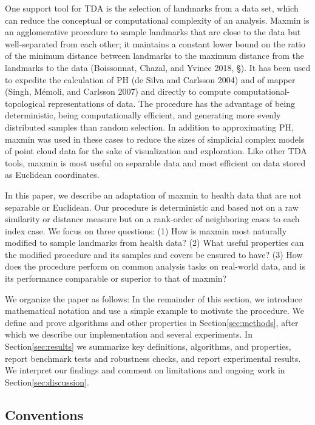 \documentclass{article}
\begin{document}
One support tool for TDA is the selection of landmarks from a data set,
which can reduce the conceptual or computational complexity of an
analysis. Maxmin is an agglomerative procedure to sample landmarks that
are close to the data but well-separated from each other; it maintains a
constant lower bound on the ratio of the minimum distance between
landmarks to the maximum distance from the landmarks to the data
(Boissonnat, Chazal, and Yvinec 2018, \S{}). It has been used
to expedite the calculation of PH (de Silva and Carlsson 2004) and of
mapper (Singh, Mémoli, and Carlsson 2007) and directly to compute
computational-topological representations of data. The procedure has the
advantage of being deterministic, being computationally efficient, and
generating more evenly distributed samples than random selection. In
addition to approximating PH, maxmin was used in these cases to reduce
the sizes of simplicial complex models of point cloud data for the sake
of visualization and exploration. Like other TDA tools, maxmin is most
useful on separable data and most efficient on data stored as Euclidean
coordinates.

In this paper, we describe an adaptation of maxmin to health data that
are not separable or Euclidean. Our procedure is deterministic and based
not on a raw similarity or distance measure but on a rank-order of
neighboring cases to each index case. We focus on three questions: (1)
How is maxmin most naturally modified to sample landmarks from health
data? (2) What useful properties can the modified procedure and its
samples and covers be ensured to have? (3) How does the procedure
perform on common analysis tasks on real-world data, and is its
performance comparable or superior to that of maxmin?

We organize the paper as follows: In the remainder of this section, we
introduce mathematical notation and use a simple example to motivate the
procedure. We define and prove algorithms and other properties in
Section\nbs\ref{sec:methods}, after which we describe our implementation
and several experiments. In Section\nbs\ref{sec:results} we summarize
key definitions, algorithms, and properties, report benchmark tests and
robustness checks, and report experimental results. We interpret our
findings and comment on limitations and ongoing work in
Section\nbs\ref{sec:discussion}.

\hypertarget{conventions}{%
\subsection{Conventions}\label{conventions}}
\end{document}
